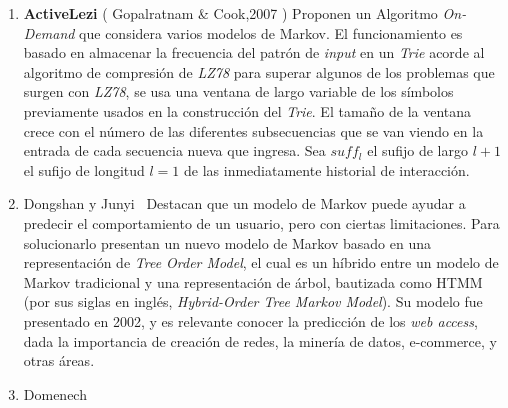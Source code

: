 \begin{enumerate}
{	%
	
	
	
	
	}
  \item \textbf{ActiveLezi} ( Gopalratnam \& Cook,2007 \etal\cite{Gopalratnam2007}) 
  {  
  Proponen un Algoritmo \emph{On-Demand} que considera varios modelos de Markov.  
  El funcionamiento es basado en almacenar la frecuencia del patrón de \emph{input} en un \emph{Trie} acorde al algoritmo de compresión de \emph{LZ78} para superar algunos de los problemas que surgen con \emph{LZ78}, se usa una ventana de largo variable de los símbolos previamente usados en la construcción del \emph{Trie}. El tamaño de la ventana crece con el número de las diferentes subsecuencias que se van viendo en la entrada de cada secuencia nueva que ingresa.  Sea $suff_{l}$  el sufijo de largo $l+1$ el sufijo de longitud $l=1$ de las inmediatamente historial de interacción.%
 }



  \item Dongshan y Junyi~\cite{Dongshan2002} 
  {
	  Destacan que un modelo de Markov puede ayudar a predecir el comportamiento de un usuario, pero con ciertas limitaciones. Para solucionarlo presentan un nuevo modelo de Markov basado en una representación de \emph{Tree Order Model}, el cual es un híbrido entre un modelo de Markov tradicional y una representación de árbol, bautizada como HTMM (por sus siglas en inglés, \emph{Hybrid-Order Tree Markov Model}).
	  Su modelo fue presentado en 2002, y es relevante conocer la predicción de los \emph{web access}, dada la importancia de creación de redes, la minería de datos, e-commerce, y otras áreas.
	}
  \item Domenech \etal~\cite{Domenech2006}
  

\end{enumerate}
